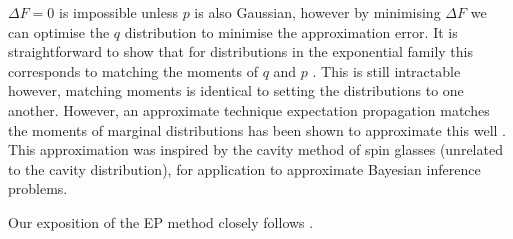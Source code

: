 \documentclass[11pt,twoside]{report}
\begin{document}
$\Delta F = 0$ is impossible unless $p$ is also Gaussian, however by minimising $\Delta F$ we can optimise the $q$ distribution to minimise the approximation error.
It is straightforward to show that for distributions in the exponential family this corresponds to matching the moments of $q$ and $p$ \cite{Minka2001,MinkaUAI2001,Rasmussen2006,Cunningham2011}.
This is still intractable however, matching moments is identical to setting the distributions to one another.
However, an approximate technique expectation propagation matches the moments of marginal distributions has been shown to approximate this well \cite{Minka2001,MinkaUAI2001,Rasmussen2006,Cunningham2011}.
This approximation was inspired by the cavity method of spin glasses (unrelated to the cavity distribution), for application to approximate Bayesian inference problems.

Our exposition of the EP method closely follows \cite{Cunningham2011}.
\end{document}
